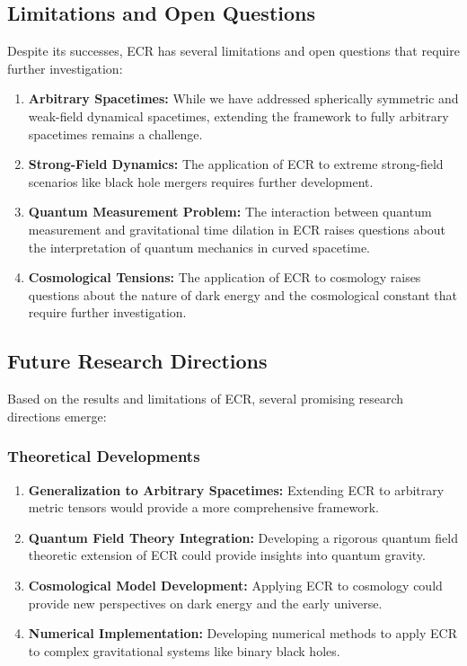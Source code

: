 \documentclass[11pt,a4paper]{article}
\begin{document}
\subsection{Limitations and Open Questions}

Despite its successes, ECR has several limitations and open questions that require further investigation:

\begin{enumerate}
    \item \textbf{Arbitrary Spacetimes:} While we have addressed spherically symmetric and weak-field dynamical spacetimes, extending the framework to fully arbitrary spacetimes remains a challenge.
    
    \item \textbf{Strong-Field Dynamics:} The application of ECR to extreme strong-field scenarios like black hole mergers requires further development.
    
    \item \textbf{Quantum Measurement Problem:} The interaction between quantum measurement and gravitational time dilation in ECR raises questions about the interpretation of quantum mechanics in curved spacetime.
    
    \item \textbf{Cosmological Tensions:} The application of ECR to cosmology raises questions about the nature of dark energy and the cosmological constant that require further investigation.
\end{enumerate}

\subsection{Future Research Directions}

Based on the results and limitations of ECR, several promising research directions emerge:

\subsubsection{Theoretical Developments}
\begin{enumerate}
    \item \textbf{Generalization to Arbitrary Spacetimes:} Extending ECR to arbitrary metric tensors would provide a more comprehensive framework.
    
    \item \textbf{Quantum Field Theory Integration:} Developing a rigorous quantum field theoretic extension of ECR could provide insights into quantum gravity.
    
    \item \textbf{Cosmological Model Development:} Applying ECR to cosmology could provide new perspectives on dark energy and the early universe.
    
    \item \textbf{Numerical Implementation:} Developing numerical methods to apply ECR to complex gravitational systems like binary black holes.
\end{enumerate}
\end{document}
